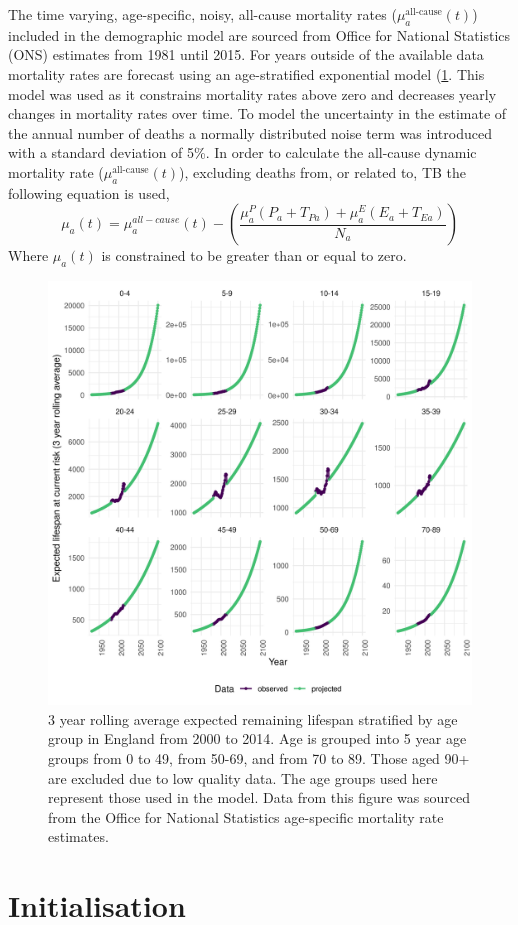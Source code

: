 \documentclass[11pt,twoside]{bristolthesis}
\begin{document}
  The time varying, age-specific, noisy, all-cause mortality rates (\(\mu^{\text{all-cause}}_a(t)\)) included in the demographic model are sourced from Office for National Statistics (ONS) estimates from 1981 until 2015. For years outside of the available data mortality rates are forecast using an age-stratified exponential model (\ref{fig:mortality-england}. This model was used as it constrains mortality rates above zero and decreases yearly changes in mortality rates over time. To model the uncertainty in the estimate of the annual number of deaths a normally distributed noise term was introduced with a standard deviation of 5\%. In order to calculate the all-cause dynamic mortality rate (\(\mu^{\text{all-cause}}_a(t)\)), excluding deaths from, or related to, TB the following equation is used,
  \begin{equation}
  \mu_a(t) = \mu^{all-cause}_a(t) - \left(\frac{\mu^P_a(P_a + T_{Pa}) + \mu^E_a(E_a + T_{Ea})}{N_a}\right)
    \label{eq:adjusted-mortality}
  \end{equation}
  Where \(\mu_a(t)\) is constrained to be greater than or equal to zero.
  \begin{figure}
  
  {\centering \includegraphics[width=0.8\linewidth]{chapters/model-development/resources/figure/mortality} 
  
  }
  
  \caption{3 year rolling average expected remaining lifespan stratified by age group in England from 2000 to 2014. Age is grouped into 5 year age groups from 0 to 49, from 50-69, and from 70 to 89. Those aged 90+ are excluded due to low quality data. The age groups used here represent those used in the model. Data from this figure was sourced from the Office for National Statistics age-specific mortality rate estimates.}\label{fig:mortality-england}
  \end{figure}
  \hypertarget{initialisation}{%
  \section{Initialisation}\label{initialisation}}
  
\end{document}
